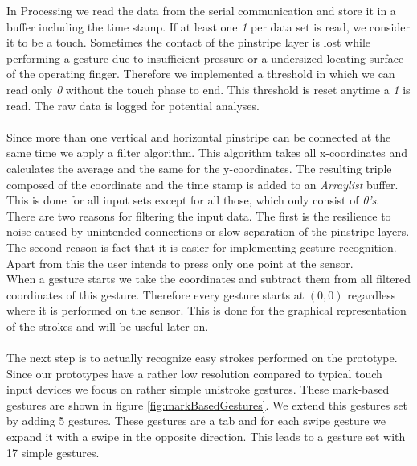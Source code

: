 In Processing we read the data from the serial communication and store it in a buffer including the time stamp.  If at least one \emph{1} per data set is read, we consider it to be a touch. Sometimes the contact of the pinstripe layer is lost while performing a gesture due to insufficient pressure or a undersized locating surface of the operating finger. Therefore we implemented a threshold in which we can read only \emph{0} without the touch phase to end. This threshold is reset anytime a \emph{1} is read. The raw data is logged for potential analyses. \\ \\
Since more than one vertical and horizontal pinstripe can be connected at the same time we apply a filter algorithm. This algorithm takes all x-coordinates and calculates the average and the same for the y-coordinates. The resulting triple composed of the coordinate and the time stamp is added to an \emph{Arraylist} buffer. This is done for all input sets except for all those, which only consist of \emph{0's}. There are two reasons for filtering the input data. The first is the resilience to noise caused by unintended connections or slow separation of the pinstripe layers. The second reason is fact that it is easier for implementing gesture recognition. Apart from this the user intends to press only one point at the sensor.
\\
When a gesture starts we take the coordinates and subtract them from all filtered coordinates of this gesture. Therefore every gesture starts at $(0,0)$ regardless where it is performed on the sensor. This is done for the graphical representation of the strokes and will be useful later on.
\\ \\
The next step is to actually recognize easy strokes performed on the prototype.  Since our prototypes have a rather low resolution compared to typical touch input devices we focus on rather simple unistroke gestures. These mark-based gestures are shown in figure \ref{fig:markBasedGestures}. We extend this gestures set by adding 5 gestures. These gestures are a tab and for each swipe gesture we expand it with a swipe in the opposite direction. This leads to a gesture set with 17 simple gestures. \\
